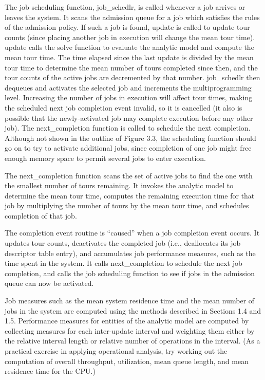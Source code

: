 The job scheduling function, job\_schedlr, is called whenever a job arrives or
leaves the system. It scans the admission queue for a job which satisfies the
rules of the admission policy. If such a job is found, update is called to
update tour counts (since placing another job in execution will change the mean
tour time). update calls the solve function to evaluate the analytic model and
compute the mean tour time. The time elapsed since the last update is divided
by the mean tour time to determine the mean number of tours completed since
then, and the tour counts of the active jobs are decremented by that number.
job\_schedlr then dequeues and activates the selected job and increments the
multiprogramming level. Increasing the number of jobs in execution will affect
tour times, making the scheduled next job completion event invalid, so it is
cancelled (it also is possible that the newly-activated job may complete
execution before any other job). The next\_completion function is called to
schedule the next completion. Although not shown in the outline of Figure 3.3,
the scheduling function should go on to try to activate additional jobs, since
completion of one job might free enough memory space to permit several jobs to
enter execution.

The next\_completion function scans the set of active jobs to find the one with
the smallest number of tours remaining. It invokes the analytic model to
determine the mean tour time, computes the remaining execution time for that
job by multiplying the number of tours by the mean tour time, and schedules
completion of that job.

The completion event routine is ``caused'' when a job completion event occurs.
It updates tour counts, deactivates the completed job (i.e., deallocates its
job descriptor table entry), and accumulates job performance measures, such as
the time spent in the system. It calls next\_completion to schedule the next job
completion, and calls the job scheduling function to see if jobs in the
admission queue can now be activated.

Job measures such as the mean system residence time and the mean number of
jobs in the system are computed using the methods described in Sections 1.4
and 1.5. Performance measures for entities of the analytic model are computed
by collecting measures for each inter-update interval and weighting them
 either by the relative interval length or relative number of operations in the
interval. (As a practical exercise in applying operational analysis, try
working out the computation of overall throughput, utilization, mean queue
length, and mean residence time for the CPU.)


